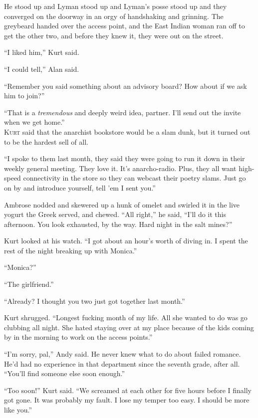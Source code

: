 \documentclass{article}
\begin{document}
He stood up and Lyman stood up and Lyman's posse stood up and they
converged on the doorway in an orgy of handshaking and grinning.  The
greybeard handed over the access point, and the East Indian woman ran
off to get the other two, and before they knew it, they were out on
the street.

``I liked him,'' Kurt said.

``I could tell,'' Alan said.

``Remember you said something about an advisory board?  How about if
we ask him to join?''

``That is a \textit{tremendous} and deeply weird idea, partner.  I'll
send out the invite when we get home.''
\\
\lettrine[lines=3, lhang=.5, nindent=0pt, findent=2pt]{K}{urt} said that the anarchist bookstore would be a slam dunk, but it
turned out to be the hardest sell of all.

``I spoke to them last month, they said they were going to run it down
in their weekly general meeting.  They love it.  It's anarcho-radio. 
Plus, they all want high-speed connectivity in the store so they can
webcast their poetry slams.  Just go on by and introduce yourself,
tell 'em I sent you.''

Ambrose nodded and skewered up a hunk of omelet and swirled it in the
live yogurt the Greek served, and chewed.  ``All right,'' he said,
``I'll do it this afternoon.  You look exhausted, by the way.  Hard
night in the salt mines?''

Kurt looked at his watch.  ``I got about an hour's worth of diving in. 
I spent the rest of the night breaking up with Monica.''

``Monica?''

``The girlfriend.''

``Already?  I thought you two just got together last month.''

Kurt shrugged.  ``Longest fucking month of my life.  All she wanted to
do was go clubbing all night.  She hated staying over at my place
because of the kids coming by in the morning to work on the access
points.''

``I'm sorry, pal,'' Andy said.  He never knew what to do about failed
romance.  He'd had no experience in that department since the seventh
grade, after all.  ``You'll find someone else soon enough.''

``Too soon!'' Kurt said.  ``We screamed at each other for five hours
before I finally got gone.  It was probably my fault.  I lose my
temper too easy.  I should be more like you.''
\end{document}
